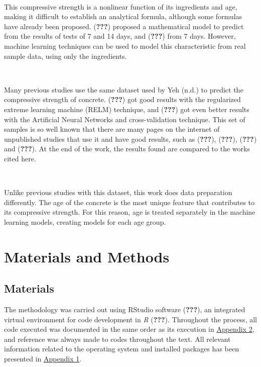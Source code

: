 \documentclass[]{article}
\begin{document}
~

This compressive strength is a nonlinear function of its ingredients and
age, making it difficult to establish an analytical formula, although
some formulas have already been proposed. ({\textbf{???}}) proposed a
mathematical model to predict from the results of tests of 7 and 14
days, and ({\textbf{???}}) from 7 days. However, machine learning
techniques can be used to model this characteristic from real sample
data, using only the ingredients.

~

Many previous studies use the same dataset used by Yeh (n.d.) to predict
the compressive strength of concrete. ({\textbf{???}}) got good results
with the regularized extreme learning machine (RELM) technique, and
({\textbf{???}}) got even better results with the Artificial Neural
Networks and cross-validation technique. This set of samples is so well
known that there are many pages on the internet of unpublished studies
that use it and have good results, such as ({\textbf{???}}),
({\textbf{???}}), ({\textbf{???}}) and ({\textbf{???}}). At the end of
the work, the results found are compared to the works cited here.

~

Unlike previous studies with this dataset, this work does data
preparation differently. The age of the concrete is the most unique
feature that contributes to its compressive strength. For this reason,
age is treated separately in the machine learning models, creating
models for each age group.

\hypertarget{materials-and-methods}{%
\section{Materials and Methods}\label{materials-and-methods}}

\hypertarget{materials}{%
\subsection{Materials}\label{materials}}

The methodology was carried out using RStudio software ({\textbf{???}}),
an integrated virtual environment for code development in \emph{R}
({\textbf{???}}). Throughout the process, all code executed was
documented in the same order as its execution in
\protect\hyperlink{appendix2}{Appendix 2}, and reference was always made
to codes throughout the text. All relevant information related to the
operating system and installed packages has been presented in
\protect\hyperlink{appendix1}{Appendix 1}.
\end{document}
